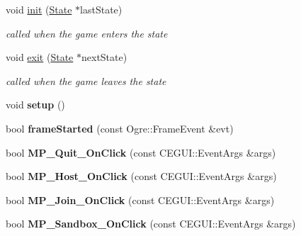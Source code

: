 \begin{DoxyCompactItemize}
\item 
\hypertarget{classMenu_aa3389f56fa121c5f1fb2e95aa60e0f59}{
void \hyperlink{classMenu_aa3389f56fa121c5f1fb2e95aa60e0f59}{init} (\hyperlink{classState}{\-State} $\ast$last\-State)}
\label{d8/ddb/classMenu_aa3389f56fa121c5f1fb2e95aa60e0f59}

\begin{DoxyCompactList}\small\item\em called when the game enters the state \end{DoxyCompactList}\item 
\hypertarget{classMenu_a191dcf4575d563b8d42171d9529dfd87}{
void \hyperlink{classMenu_a191dcf4575d563b8d42171d9529dfd87}{exit} (\hyperlink{classState}{\-State} $\ast$next\-State)}
\label{d8/ddb/classMenu_a191dcf4575d563b8d42171d9529dfd87}

\begin{DoxyCompactList}\small\item\em called when the game leaves the state \end{DoxyCompactList}\item 
\hypertarget{classMenu_a648481366ba5ae8cfda048ae7ff201cc}{
void {\bfseries setup} ()}
\label{d8/ddb/classMenu_a648481366ba5ae8cfda048ae7ff201cc}

\item 
\hypertarget{classMenu_a49594a17d625297f9f052a8d503b04e8}{
bool {\bfseries frame\-Started} (const \-Ogre\-::\-Frame\-Event \&evt)}
\label{d8/ddb/classMenu_a49594a17d625297f9f052a8d503b04e8}

\item 
\hypertarget{classMenu_aa41e0eb9cda99d04a2475e6d68abb9fc}{
bool {\bfseries \-M\-P\-\_\-\-Quit\-\_\-\-On\-Click} (const \-C\-E\-G\-U\-I\-::\-Event\-Args \&args)}
\label{d8/ddb/classMenu_aa41e0eb9cda99d04a2475e6d68abb9fc}

\item 
\hypertarget{classMenu_a1309d13a2889fbf52cd0ef633e6fc15c}{
bool {\bfseries \-M\-P\-\_\-\-Host\-\_\-\-On\-Click} (const \-C\-E\-G\-U\-I\-::\-Event\-Args \&args)}
\label{d8/ddb/classMenu_a1309d13a2889fbf52cd0ef633e6fc15c}

\item 
\hypertarget{classMenu_a53b2cde9472a1662c40256b07d58be29}{
bool {\bfseries \-M\-P\-\_\-\-Join\-\_\-\-On\-Click} (const \-C\-E\-G\-U\-I\-::\-Event\-Args \&args)}
\label{d8/ddb/classMenu_a53b2cde9472a1662c40256b07d58be29}

\item 
\hypertarget{classMenu_a545318306f98d0adbd97554f47c1fdf8}{
bool {\bfseries \-M\-P\-\_\-\-Sandbox\-\_\-\-On\-Click} (const \-C\-E\-G\-U\-I\-::\-Event\-Args \&args)}
\label{d8/ddb/classMenu_a545318306f98d0adbd97554f47c1fdf8}


\end{DoxyCompactItemize}

